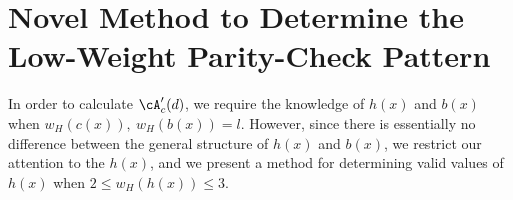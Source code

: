 \section{Novel Method to Determine the Low-Weight Parity-Check Pattern}
\label{sec3}
In order to calculate $\cA'_c(d)$, we require the knowledge of $h(x)$ and $b(x)$ when $w_H(c(x)),~w_H(b(x))= l$. However, since there is essentially no difference between the general structure of $h(x)$ and $b(x)$, we restrict our attention to the $h(x)$, and
we present a method for determining valid values of $h(x)$ when $2 \leq w_H(h(x))\leq 3$. 

%






